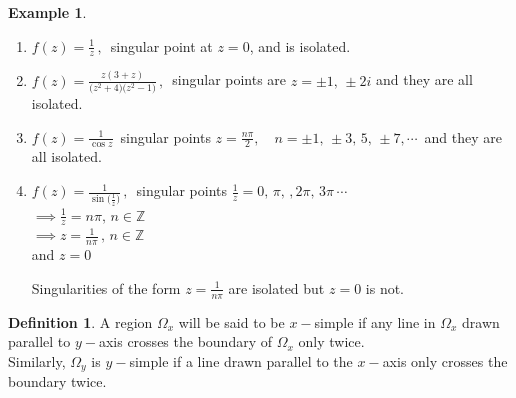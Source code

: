 \documentclass[11pt,a4paper]{article}
\theoremstyle{definition}
\newtheorem{definition}[thm]{Definition}
\newtheorem{example}[thm]{Example}
\begin{document}
\begin{example}
\begin{enumerate}
\item $f(z) = \frac{1}{z}\,,\,$ singular point at $z = 0$, and is isolated.
\item $f(z) = \frac{z(3 + z)}{\big(z^2 + 4\big)\big(z^2 - 1\big)}\,,\,$ singular points are $z = \pm 1,\, \pm 2i$ and they are all isolated.
\item $f(z) = \frac{1}{\cos z}\,$ singular points $z = \frac{n\pi}{2}, \quad  n = \pm 1, \, \pm 3, \, 5,\,\pm 7,\cdots\,$ and they are all isolated.
\item $f(z) = \frac{1}{\sin \Big(\frac{1}{z}\Big)}\,, \,$ singular points $\frac{1}{z} = 0, \, \pi, \,, 2\pi, \, 3\pi\,\cdots$\\
$\implies \frac{1}{z} = n\pi, \, n\in \mathbb{Z}$\\
$\implies z = \frac{1}{n\pi}\,,\, n\in \mathbb{Z}$\\
and $z = 0$




\begin{figure}[H]
\centering
{}
\end{figure}











Singularities of the form $z = \frac{1}{n\pi}$ are isolated but $z = 0$ is not.\\
\end{enumerate}




\begin{definition}
A region $\Omega_x$ will be said to be $x-$simple if any line in $\Omega_x$ drawn parallel to $y-$axis crosses the boundary of $\Omega_x$ only twice.\\

Similarly, $\Omega_y$ is $y-$simple if a line drawn parallel to the $x-$axis only crosses the boundary twice.


\end{definition}
\end{example}
\end{document}
